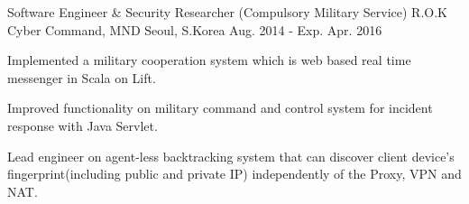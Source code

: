 \begin{cventries}
  \cventry
    {Software Engineer \& Security Researcher (Compulsory Military Service)}
    {R.O.K Cyber Command, MND}
    {Seoul, S.Korea}
    {Aug. 2014 - Exp. Apr. 2016}
    {
      \begin{cvitems}
        \item {Implemented a military cooperation system which is web based real time messenger in Scala on Lift.}
        \item {Improved functionality on military command and control system for incident response with Java Servlet.}
        \item {Lead engineer on agent-less backtracking system that can discover client device's fingerprint(including public and private IP) independently of the Proxy, VPN and NAT.}
      \end{cvitems}
    } 
\end{cventries}
